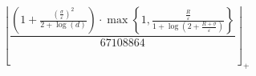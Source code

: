 \[\left\lfloor \frac{\left(1 + \frac{\left(\frac{\sigma}{\varepsilon}\right)^{2}}{2 + \log\left(d\right)}\right) \cdot \max\left\{ 1, \frac{\frac{R}{\varepsilon}}{1 + \log\left(2 + \frac{R + \sigma}{\varepsilon}\right)} \right\}}{67108864} \right\rfloor_{+}\]

